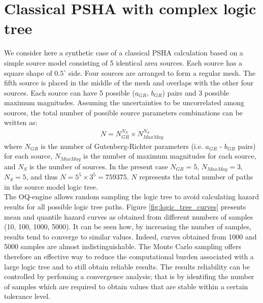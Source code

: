 \section{Classical PSHA with complex logic tree}
We consider here a synthetic case of a classical PSHA calculation based on a simple source model consisting of 5 identical area sources. Each source has a square shape of $0.5^{\circ}$ side. Four sources are arranged to form a regular mesh. The fifth source is placed in the middle of the mesh and overlaps with the other
four sources. Each source can have 5 possible ($a_{GR}$, $b_{GR}$) pairs and 3 possible
maximum magnitudes. Assuming the uncertainties to be uncorrelated among sources, the total number of
possible source parameters combinations can be written as:
\begin{align}
N = N_{GR}^{N_{S}} \times N_{MaxMag}^{N_{S}}
\end{align}
where $N_{GR}$ is the number of Gutenberg-Richter parameters (i.e. $a_{GR}$ - $b_{GR}$ pairs) for each
source, $N_{MaxMag}$ is the number of maximum magnitudes for each source, and $N_{S}$ is the number
of sources. In the present case $N_{GR}=5$, $N_{MaxMag}=3$, $N_{S}=5$, and thus $N=5^{5} \times 3^{5}=759375$. $N$ represents the total number of paths in the source model logic tree.\\
The OQ-engine allows random sampling the logic tree to avoid calculating hazard results for all possible
logic tree paths. Figure \ref{fig:logic_tree_curves} presents mean and quantile hazard curves
as obtained from different numbers of samples (10, 100, 1000, 5000). It can be seen how, by increasing the number
of samples, results tend to converge to similar values. Indeed, curves obtained from 1000 and 5000 samples are almost indistinguishable. The Monte Carlo sampling offers therefore an effective way to reduce the computational burden associated with a large logic tree and to still obtain reliable results. The results reliability can be controlled by perfoming a convergence analysis; that is by identifing the number of samples
which are required to obtain values that are stable within a certain tolerance level.
